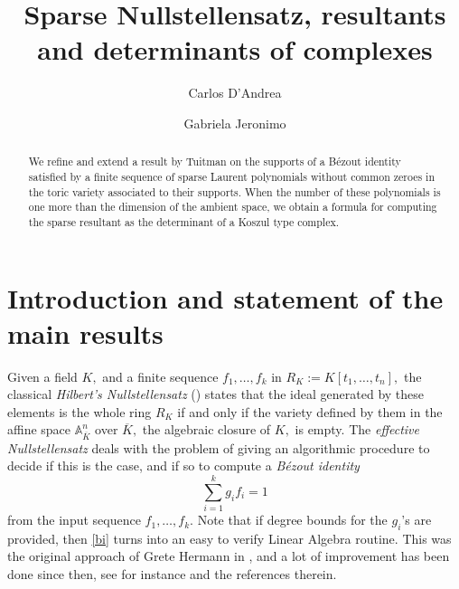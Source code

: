\documentclass[a4paper,11pt]{amsart}
\newcommand{\A}{\mathbb{A}}
\newcounter{thm}
\numberwithin{thm}{section}
\numberwithin{equation}{section}
\theoremstyle{definition}
\theoremstyle{plain}
\begin{document}
\title{Sparse Nullstellensatz, resultants and determinants of complexes}

\author{Carlos D'Andrea}
\address{Departament de Matem\`atiques i Inform\`atica, Universitat de Barcelona. Gran
Via 585, 08007 Barcelona, Spain \&  Centre de Recerca Matem\`atica, Edifici C, Campus Bellaterra, 08193 Bellaterra, Spain
}

\author{Gabriela Jeronimo}
\address{Departamento de Matem\'atica, FCEN, Universidad de Buenos Aires, Ciudad Universitaria - Pab. I, (1428) Buenos Aires, Argentina, and
CONICET-Universidad de Buenos Aires, Instituto de Investigaciones Matem\'aticas ''Luis A. Santal\'o'' (IMAS), Buenos Aires, Argentina}


\begin{abstract}
We refine and extend a result by Tuitman on the supports of a B\'ezout identity satisfied by a finite sequence of sparse Laurent polynomials without common zeroes in the toric variety associated to their supports. When the number of these polynomials is one more than the dimension of the ambient space, we obtain a formula for computing the sparse resultant as the determinant of a Koszul type complex.
\end{abstract}



\maketitle

\section{Introduction and statement of the main results}
Given a field $K,$  and a finite sequence $f_1,\ldots, f_k$ in $R_K:=K[t_1,\ldots, t_n],$   the classical {\em Hilbert's Nullstellensatz} (\cite{hil93}) states that the ideal generated by these elements is the whole ring $R_K$ if and only if the variety defined by them in the affine space $\A^n_{\overline{K}}$  over $\overline{K},$ the algebraic closure of $K,$ is empty.  The {\em effective Nullstellensatz } deals with the problem of giving an algorithmic procedure to decide if this is the case, and if so to compute a {\it B\'ezout identity}
\begin{equation}\label{bi}
\sum_{i=1}^k g_if_i=1
\end{equation}
from the input sequence $f_1,\ldots, f_k.$  Note that if degree bounds for the $g_i$'s are provided, then \eqref{bi} turns into an easy to verify Linear Algebra routine. This was the original approach of Grete Hermann in \cite{her26}, and a lot of improvement has been done since then, see for instance \cite{DKS13} and the references therein.
\end{document}
